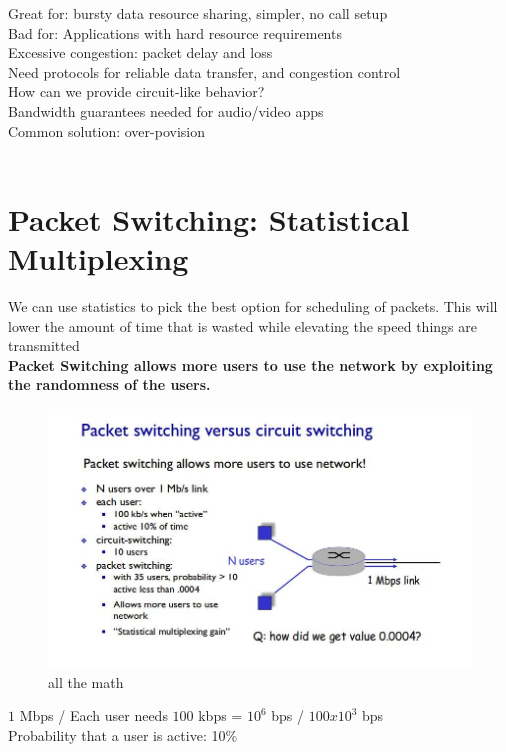 \noindent Great for: bursty data \arr resource sharing, simpler, no call setup\\
\noindent Bad for: Applications with hard resource requirements\\
    \indent Excessive congestion: packet delay and loss\\
    \indent Need protocols for reliable data transfer, and congestion control\\

\noindent How can we provide circuit-like behavior?\\
    \indent Bandwidth guarantees needed for audio/video apps\\
    \indent Common solution: over-povision\\

 \\
\newpage
\section*{Packet Switching: Statistical Multiplexing}
We can use statistics to pick the best option for scheduling of packets.  This will lower the amount of time that is wasted while elevating the speed things are transmitted\\
{\bf{Packet Switching allows more users to use the network by exploiting the randomness of the users.}}\\
\begin{figure}[h!]
\centering
\includegraphics[width=0.8\linewidth]{Slide-A.jpg}
\caption[all the math]{all the math}
\label{fig:all the math}
\end{figure}	


\noindent $1$ Mbps / Each user needs $100$ kbps = $10^6$ bps / $100 x10^3$ bps\\
Probability that a user is active: 10\%\\


\newpage
